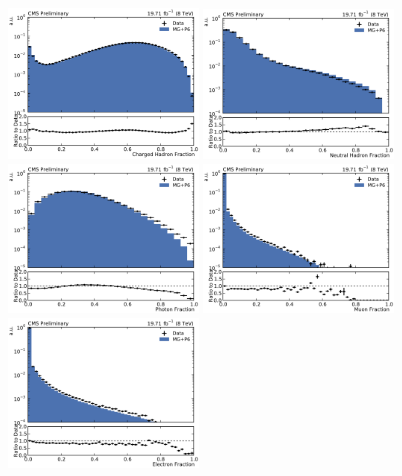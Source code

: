 \begin{figure}[htbp]
    \centering
    \includegraphics[width=0.45\textwidth]{figures/measurement/jetprop_chf_default.pdf}\hfill
    \includegraphics[width=0.45\textwidth]{figures/measurement/jetprop_nhf_default.pdf}
    \includegraphics[width=0.45\textwidth]{figures/measurement/jetprop_gammaf_default.pdf}\hfill
    \includegraphics[width=0.45\textwidth]{figures/measurement/jetprop_muf_default.pdf}
    \includegraphics[width=0.45\textwidth]{figures/measurement/jetprop_ef_default.pdf}\hfill

\end{figure}
